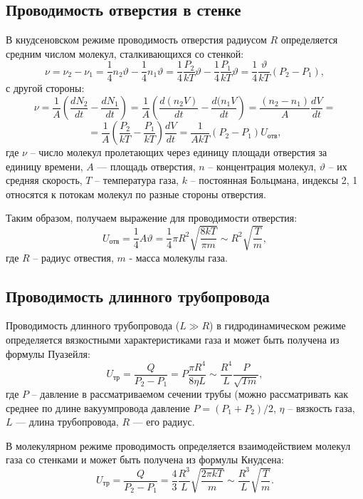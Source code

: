 \documentclass[a4paper, 12pt]{article}
\begin{document}
\subsection{Проводимость отверстия в стенке}

В кнудсеновском режиме проводимость отверстия радиусом $R$ определяется средним числом молекул, сталкивающихся со стенкой:
\[\nu = \nu_2 - \nu_1 = \frac{1}{4}n_2\vartheta - \frac{1}{4}n_1\vartheta = \frac{1}{4}\frac{P_2}{kT}\vartheta - \frac{1}{4}\frac{P_1}{kT}\vartheta = \frac{1}{4}\frac{\vartheta}{kT}(P_2 - P_1),\]
с другой стороны:
\[\nu = \frac{1}{A}\left(\frac{dN_2}{dt} - \frac{dN_1}{dt}\right) = \frac{1}{A}\left(\frac{d(n_2V)}{dt} - \frac{d(n_1V}{dt}\right) = \frac{(n_2 - n_1)}{A}\frac{dV}{dt} =\]
\[= \frac{1}{A}\left(\frac{P_2}{kT} - \frac{P_1}{kT}\right)\frac{dV}{dt} = \frac{1}{AkT}(P_2 - P_1)U_{отв},\]
где $\nu$ -- число молекул пролетающих через единицу площади отверстия
за единицу времени, $A$ — площадь отверстия, $n$ -- концентрация молекул,
$\vartheta$ -- их средняя скорость, $T$ -- температура газа, $k$ -- постоянная Больцмана, индексы 2, 1 относятся к потокам молекул по разные стороны отверстия.

Таким образом, получаем выражение для проводимости отверстия:
\begin{equation}\label{u_отв}
U_{отв} = \frac{1}{4}A\vartheta = \frac{1}{4}\pi R^2\sqrt{\frac{8kT}{\pi m}} \sim R^2\sqrt{\frac{T}{m}},
\end{equation}
где $R$ -- радиус отвестия, $m$ - масса молекулы газа.

\subsection{Проводимость длинного трубопровода}

Проводимость длинного трубопровода ($L \gg R$) в гидродинамическом режиме определяется вязкостными характеристиками газа и может
быть получена из формулы Пуазейля:
\begin{equation}\label{u_gidro}
U_{\text{тр}} = \dfrac{Q}{P_2 - P_1} = P\dfrac{\pi R^4}{8 \eta L} \sim \dfrac{R^4}{L} \dfrac{P}{\sqrt{Tm}},
\end{equation}
где $P$ -- давление в рассматриваемом сечении трубы (можно рассматривать как среднее по длине вакуумпровода давление $P = (P_1 + P_2)/2$, $\eta$ -- вязкость газа, $L$ — длина трубопровода, $R$ — его радиус.

В молекулярном режиме проводимость определяется взаимодействием молекул газа со стенками и может быть получена из формулы
Кнудсена:
\begin{equation}\label{u_molek}
U_{\text{тр}} = \dfrac{Q}{P_2 - P_1} = \dfrac{4}{3} \dfrac{R^3}{L}\sqrt{\dfrac{2 \pi k T}{m}} \sim \dfrac{R^3}{L} \sqrt{\dfrac{T}{m}}.
\end{equation}
\end{document}
